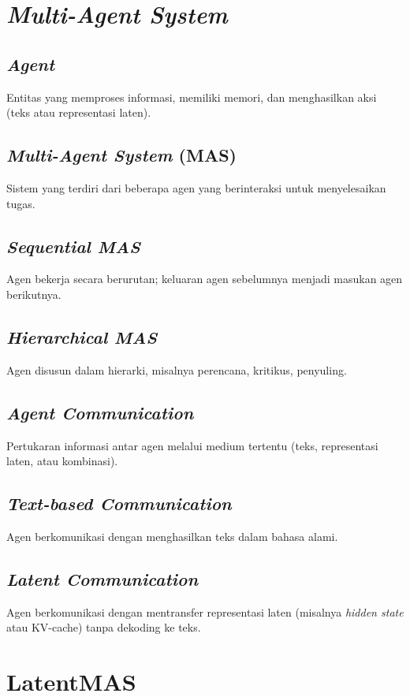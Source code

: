 \section{\textit{Multi-Agent System}}

\subsection{\textit{Agent}}
Entitas yang memproses informasi, memiliki memori, dan menghasilkan aksi (teks atau representasi laten).

\subsection{\textit{Multi-Agent System} (MAS)}
Sistem yang terdiri dari beberapa agen yang berinteraksi untuk menyelesaikan tugas.

\subsection{\textit{Sequential MAS}}
Agen bekerja secara berurutan; keluaran agen sebelumnya menjadi masukan agen berikutnya.

\subsection{\textit{Hierarchical MAS}}
Agen disusun dalam hierarki, misalnya perencana, kritikus, penyuling.

\subsection{\textit{Agent Communication}}
Pertukaran informasi antar agen melalui medium tertentu (teks, representasi laten, atau kombinasi).

\subsection{\textit{Text-based Communication}}
Agen berkomunikasi dengan menghasilkan teks dalam bahasa alami.

\subsection{\textit{Latent Communication}}
Agen berkomunikasi dengan mentransfer representasi laten (misalnya \textit{hidden state} atau KV-cache) tanpa dekoding ke teks.

\section{LatentMAS}

